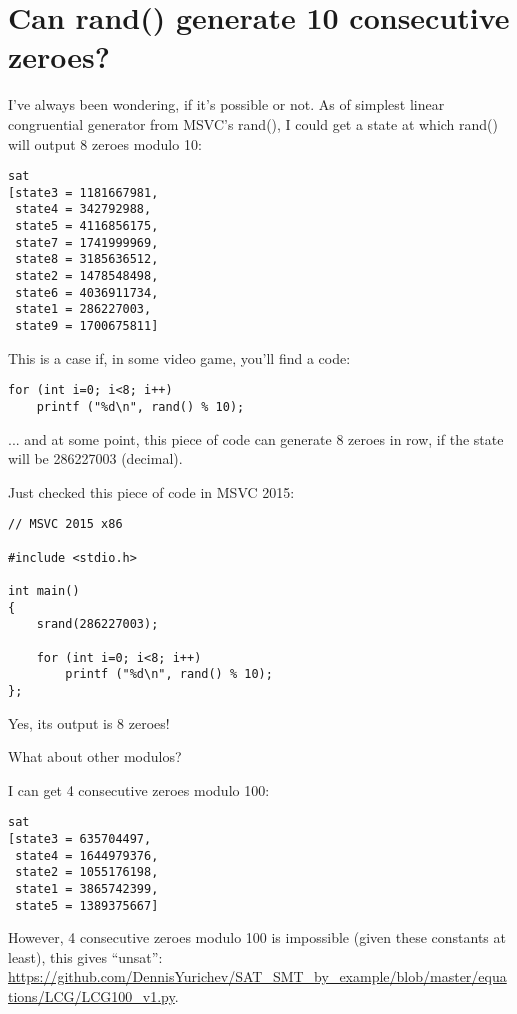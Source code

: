 \section{Can rand() generate 10 consecutive zeroes?}

\renewcommand{\CURPATH}{equations/LCG}

I've always been wondering, if it's possible or not.
As of simplest linear congruential generator from MSVC's rand(), I could get a state at which rand() will output 8 zeroes modulo 10:



\begin{lstlisting}
sat
[state3 = 1181667981,
 state4 = 342792988,
 state5 = 4116856175,
 state7 = 1741999969,
 state8 = 3185636512,
 state2 = 1478548498,
 state6 = 4036911734,
 state1 = 286227003,
 state9 = 1700675811]
\end{lstlisting}

This is a case if, in some video game, you'll find a code:

\begin{lstlisting}
for (int i=0; i<8; i++)
    printf ("%d\n", rand() % 10);
\end{lstlisting}

... and at some point, this piece of code can generate 8 zeroes in row, if the state will be 286227003 (decimal).

Just checked this piece of code in MSVC 2015:

\begin{lstlisting}
// MSVC 2015 x86

#include <stdio.h>

int main()
{
	srand(286227003);

	for (int i=0; i<8; i++)
		printf ("%d\n", rand() % 10);
};
\end{lstlisting}

Yes, its output is 8 zeroes!

What about other modulos?

I can get 4 consecutive zeroes modulo 100:



\begin{lstlisting}
sat
[state3 = 635704497,
 state4 = 1644979376,
 state2 = 1055176198,
 state1 = 3865742399,
 state5 = 1389375667]
\end{lstlisting}

However, 4 consecutive zeroes modulo 100 is impossible (given these constants at least), this gives ``unsat'':
\url{https://github.com/DennisYurichev/SAT_SMT_by_example/blob/master/equations/LCG/LCG100_v1.py}.

